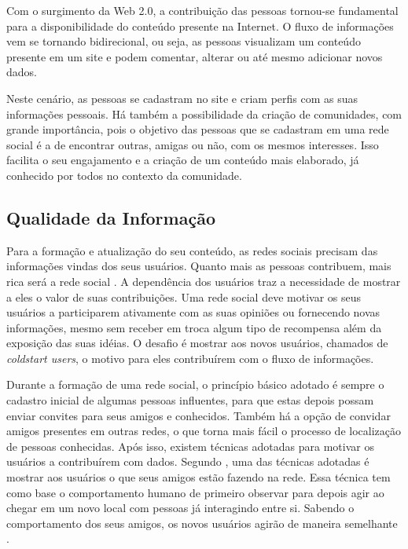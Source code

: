 Com o surgimento da Web 2.0, a contribuição das pessoas tornou-se fundamental para a disponibilidade do conteúdo presente na Internet. O fluxo de informações vem se tornando bidirecional, ou seja, as pessoas visualizam um conteúdo presente em um site e podem comentar, alterar ou até mesmo adicionar novos dados.

Neste cenário, as pessoas se cadastram no site e criam perfis com as suas informações pessoais. Há também a possibilidade da criação de comunidades, com grande importância, pois o objetivo das pessoas que se cadastram em uma rede social é a de encontrar outras, amigas ou não, com os mesmos interesses. Isso facilita o seu engajamento e a criação de um conteúdo mais elaborado, já conhecido por todos no contexto da comunidade.

\subsection{Qualidade da Informação}

Para a formação e atualização do seu conteúdo, as redes sociais precisam das informações vindas dos seus usuários. Quanto mais as pessoas contribuem, mais rica será a rede social \cite{burke2009fmm}. A dependência dos usuários traz a necessidade de mostrar a eles o valor de suas contribuições. Uma rede social deve motivar os seus usuários a participarem ativamente com as suas opiniões ou fornecendo novas informações, mesmo sem receber em troca algum tipo de recompensa além da exposição das suas idéias. O desafio é mostrar aos novos usuários, chamados de \textit{coldstart users}, o motivo para eles contribuírem com o fluxo de informações.

Durante a formação de uma rede social, o princípio básico adotado é sempre o cadastro inicial de algumas pessoas influentes, para que estas depois possam enviar convites para seus amigos e conhecidos. Também há a opção de convidar amigos presentes em outras redes, o que torna mais fácil o processo de localização de pessoas conhecidas. Após isso, existem técnicas adotadas para motivar os usuários a contribuírem com dados. Segundo \cite{burke2009fmm}, uma das técnicas adotadas é mostrar aos usuários o que seus amigos estão fazendo na rede. Essa técnica tem como base o comportamento humano de primeiro observar para depois agir ao chegar em um novo local com pessoas já interagindo entre si. Sabendo o comportamento dos seus amigos, os novos usuários agirão de maneira semelhante \cite{burke2009fmm}.

